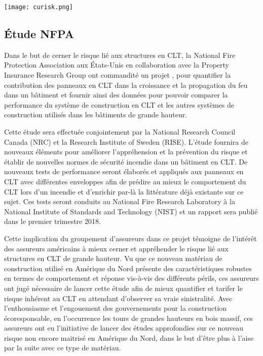 \documentclass[11pt]{article}
\begin{document}
\begin{center}
\end{center}
\begin{center}
\texttt{[image: curisk.png]}
\end{center}


\subsection{Étude NFPA}
Dans le but de cerner le risque lié aux structures en CLT, la National Fire Protection Association aux États-Unis en collaboration avec la Property Insurance Research Group \cite{pirggroup} ont commandité un projet \cite{FPRF}, pour quantifier la contribution des panneaux en CLT dans la croissance et la propagation du feu dans un bâtiment et fournir ainsi des données pour pouvoir comparer la performance du système de construction en CLT et les autres systèmes de construction utilisés dans les bâtiments de grande hauteur.

Cette étude sera effectuée conjointement par la National Research Council Canada (NRC) et la Research Institute of Sweden (RISE). L’étude fournira de nouveaux éléments pour améliorer l’appréhension et la prévention du risque et établir de nouvelles normes de sécurité incendie dans un bâtiment en CLT. De nouveaux tests de performance seront élaborés et appliqués aux panneaux en CLT avec différentes enveloppes afin de prédire au mieux le comportement du CLT lors d'un incendie et d'enrichir par-là la littérature déjà existante sur ce sujet. Ces tests seront conduits au National Fire Research Laboratory à la National Institute of Standards and Technology (NIST) et un rapport sera publié dans le premier trimestre 2018.

Cette implication du groupement d'assureurs \cite{PIRG} dans ce projet témoigne de l'intérêt des assureurs américains à mieux cerner et appréhender le risque lié aux structures en CLT de grande hauteur. Vu que ce nouveau matériau de construction utilisé en Amérique du Nord présente des caractéristiques robustes en termes de comportement et réponse vis-à-vis des différents périls, ces assureurs ont jugé nécessaire de lancer cette étude afin de mieux quantifier et tarifer le risque inhérent au CLT en attendant d'observer sa vraie sinistralité. Avec l'enthousiasme et l'engouement des gouvernements pour la construction écoresponsable, en l'occurrence les tours de grandes hauteurs en bois massif, ces assureurs ont eu l'initiative de lancer des études approfondies sur ce nouveau risque non encore maitrisé en Amérique du Nord, dans le but d'être plus à l'aise par la suite avec ce type de matériau.
\end{document}
